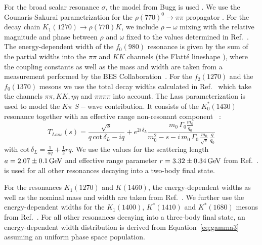  For the broad scalar resonance $\sigma$,
     		the model from Bugg is used \cite{BuggSigma}.
	We use the Gounaris-Sakurai parametrization for the $\rho(770)^{0} \to \pi \pi$ propagator \cite{GS}.
	For the decay chain $K_1(1270) \to \rho(770) K$, we include $\rho-\omega$ mixing with the relative magnitude and phase between $\rho$ and $\omega$ fixed 
	to the values determined in Ref.~\cite{Schubiger,Aaij:2648586}.
	The energy-dependent width of the $f_{0}(980)$ resonance is given by the sum of the partial widths into the $\pi\pi$ and $KK$ channels (\ie the Flatt\'{e} lineshape \cite{Flatte}),
		where the coupling constants %
		as well as the mass and width are taken from a measurement performed by the BES Collaboration~\cite{Flatte2}.
	     	For the $f_{2}(1270)$ and the $f_{0}(1370)$ mesons we use the total decay widths
		calculated in Ref.~\cite{dArgent:2017gzv} which take the channels $\pi  \pi, K  K, \eta  \eta$ and $\pi \pi \pi \pi$ into account. 	
	The {Lass} parameterization is used to model the $K\pi$ $S-$wave contribution.
	It consists of the $K_0^*(1430)$ resonance together with an effective range non-resonant component ~\cite{Lass,Aston:1987ir,Aubert:2005ce}:
	\begin{equation}
			T_{Lass}(s) = 
			\frac{\sqrt s}{q \, \text{cot}\, \delta_L- i q}   
			+ e^{2i \, \delta_L} \frac{m_0 \, \Gamma_0 \frac{m_0}{q_0}}{m_0^{2} - s - i\,m_{0}\,\Gamma_{0} \, \frac{m_{0}}{\sqrt s} \, \frac{q}{q_{0}}} 
	\label{eq:Lass}
	\end{equation}
	with $\text{cot}\, \delta_L = \frac{1}{aq} + \frac{1}{2} rq$.
	We use the values for the scattering length $a = 2.07 \pm 0.1 \mathrm{\,Ge\kern -0.1em V}$ and effective range parameter $r=3.32\pm0.34 \mathrm{\,Ge\kern -0.1em V}$ from Ref.~\cite{Lass,Aston:1987ir}.
		 is used for all other resonances decaying into a two-body final state.

		For the resonances $K_1(1270)$ and $K(1460)$, the energy-dependent widths as well as the nominal mass and width are taken from Ref.~\cite{Aaij:2017kbo}.
		We further use the energy-dependent widths for the $K_1(1400)$, $K^*(1410)$ and $K^*(1680)$ mesons from Ref.~\cite{dArgent:2017gzv}. 	
		For all other resonances decaying into a three-body final state, an energy-dependent width distribution is derived from Equation~\ref{eq:gamma3} assuming an uniform phase space population. 

